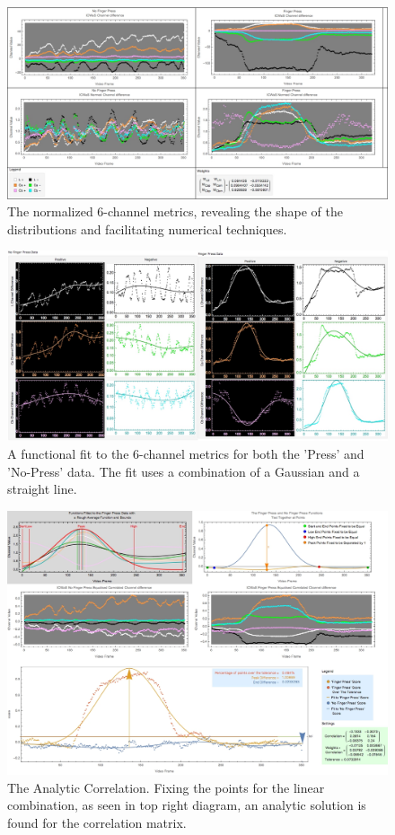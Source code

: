 \begin{figure}[tbph]
\centering
\includegraphics[width=0.95\linewidth]{Chapter4/Figs/sixChannelsWeightsGrfx}
\caption[Normalized the 6-channel metrics.]{The normalized 6-channel metrics, revealing the shape of the distributions and facilitating numerical techniques.}
\label{fig:sixchannelsweightsgrfx}
\end{figure}
\begin{figure}[tbph]
\centering
\includegraphics[width=0.95\linewidth]{Chapter4/Figs/sixChannelFitGrfx}
\caption{A functional fit to the 6-channel metrics for both the 'Press' and 'No-Press' data. The fit uses a combination of a Gaussian and a straight line.}
\label{fig:sixchannelfitgrfx}
\end{figure}
\begin{figure}[tbph]
\centering
\includegraphics[width=0.95\linewidth]{Chapter4/Figs/anyliticCorrelationGrfx}
\caption[The Analytic Correlation.]{The Analytic Correlation. Fixing the points for the linear combination, as seen in top right diagram, an analytic solution is found for the correlation matrix.}
\label{fig:anyliticcorrelationgrfx}
\end{figure}

